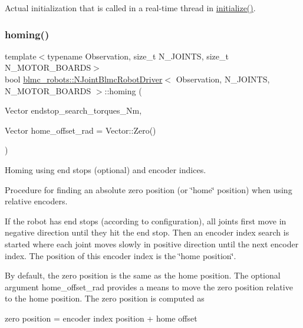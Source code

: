Actual initialization that is called in a real-\/time thread in \hyperlink{classblmc__robots_1_1NJointBlmcRobotDriver_a7a1ece2b5d4f0f607a4d0516543b0d48}{initialize()}. 

\mbox{\label{classblmc__robots_1_1NJointBlmcRobotDriver_aa2948efef69215afb233fc63acf88d3f}} 
\subsubsection{\texorpdfstring{homing()}{homing()}}
{\footnotesize\ttfamily template$<$typename Observation, size\+\_\+t N\+\_\+\+J\+O\+I\+N\+TS, size\+\_\+t N\+\_\+\+M\+O\+T\+O\+R\+\_\+\+B\+O\+A\+R\+DS$>$ \\
bool \hyperlink{classblmc__robots_1_1NJointBlmcRobotDriver}{blmc\+\_\+robots\+::\+N\+Joint\+Blmc\+Robot\+Driver}$<$ Observation, N\+\_\+\+J\+O\+I\+N\+TS, N\+\_\+\+M\+O\+T\+O\+R\+\_\+\+B\+O\+A\+R\+DS $>$\+::homing (\begin{DoxyParamCaption}\item[{Vector}]{endstop\+\_\+search\+\_\+torques\+\_\+\+Nm,  }\item[{Vector}]{home\+\_\+offset\+\_\+rad = {\ttfamily Vector\+:\+:Zero()} }\end{DoxyParamCaption})\hspace{0.3cm}{\ttfamily [protected]}}



Homing using end stops (optional) and encoder indices. 

Procedure for finding an absolute zero position (or \char`\"{}home\char`\"{} position) when using relative encoders.

If the robot has end stops (according to configuration), all joints first move in negative direction until they hit the end stop. Then an encoder index search is started where each joint moves slowly in positive direction until the next encoder index. The position of this encoder index is the \char`\"{}home position\char`\"{}.

By default, the zero position is the same as the home position. The optional argument home\+\_\+offset\+\_\+rad provides a means to move the zero position relative to the home position. The zero position is computed as \begin{DoxyVerb}zero position = encoder index position + home offset
\end{DoxyVerb}



